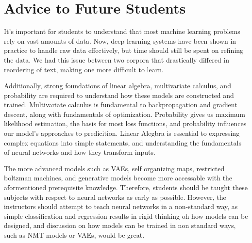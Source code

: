 \documentclass[twoside,twocolumn]{article}
\begin{document}
\section{Advice to Future Students}
\label{sec:advice}
It's important for students to understand that most machine learning problems
rely on vast amounts of data. Now, deep learning systems have been shown in
practice to handle raw data effectively, but time should still be spent
on refining the data. We had this issue between two corpora that drastically
differed in reordering of text, making one more difficult to learn.

Additionally, strong foundations of linear algebra, multivariate calculus, and
probability are required to understand how these models are constructed and
trained. Multivariate calculus is fundamental to backpropagation and gradient
descent, along with fundamentals of optimization. Probability gives us
maximum likelihood estimation, the basis for
most loss functions, and probability influences our model's approaches to
predicition. Linear Alegbra is essential to expressing complex equations into
simple statements, and understanding the fundamentals of neural networks
and how they transform inputs.

The more advanced models such as VAEs, self organizing maps, restricted
boltzman machines, and generative models become more accessable with the
aformentioned prerequisite knowledge. Therefore, students should be taught
these subjects with respect to neural networks as early as possible. However,
the instructors should attempt to teach neural networks in a non-standard way,
as simple classification and regression results in rigid thinking oh how
models can be designed, and discussion on how models can be trained in non
standard ways, such as NMT models or VAEs, would be great.




\end{document}
